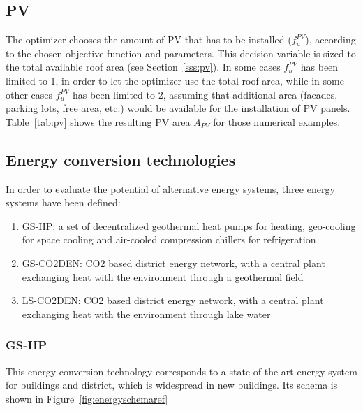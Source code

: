 \documentclass{article}
\begin{document}

\subsection{PV}\label{ss:pv}
The optimizer chooses the amount of PV that has to be installed ($f_{u}^{PV}$), according to the chosen objective function and parameters. This decision variable is sized to the total available roof area (see Section~\ref{sss:pv}). In some cases $f_{u}^{PV}$ has been limited to 1, in order to let the optimizer use the total roof area, while in some other cases $f_{u}^{PV}$ has been limited to 2, assuming that additional area (facades, parking lots, free area, etc.) would be available for the installation of PV panels. 
Table~\ref{tab:pv} shows the resulting PV area $A_{PV}$ for those numerical examples.



\subsection{Energy conversion technologies}
In order to evaluate the potential of alternative energy systems, three energy systems have been defined:
\begin{enumerate}
	\item GS-HP: a set of decentralized geothermal heat pumps for heating, geo-cooling for space cooling and air-cooled compression chillers for refrigeration
	\item GS-CO2DEN: CO2 based district energy network, with a central plant exchanging heat with the environment through a geothermal field
	\item LS-CO2DEN: CO2 based district energy network, with a central plant exchanging heat with the environment through lake water
\end{enumerate}

\subsubsection{GS-HP}
This energy conversion technology corresponds to a state of the art energy system for buildings and district, which is widespread in new buildings. Its schema is shown in Figure~\ref{fig:energyschemaref}
\end{document}
